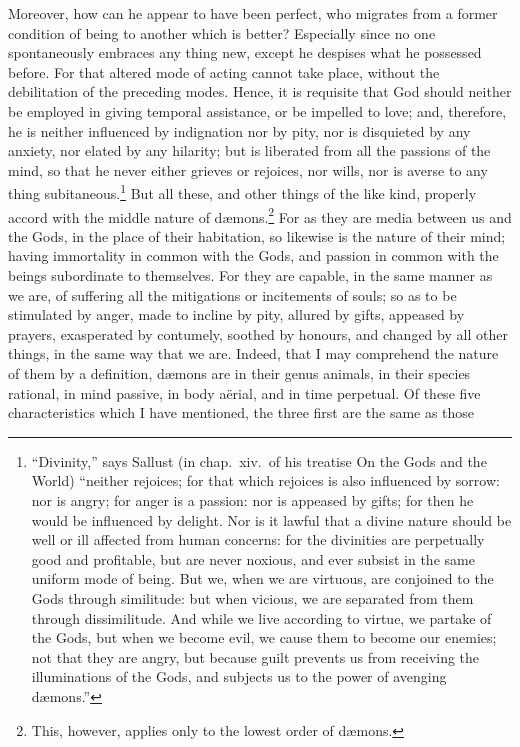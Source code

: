 \documentclass{article}
\begin{document}
Moreover, how can he appear to have been perfect, who migrates from a former
condition of being to another which is better? Especially since no one
spontaneously embraces any thing new, except he despises what he possessed
before. For that altered mode of acting cannot take place, without the
debilitation of the preceding modes. Hence, it is requisite that God should
neither be employed in giving temporal assistance, or be impelled to love; and,
therefore, he is neither influenced by indignation nor by pity, nor is
disquieted by any anxiety, nor elated by any hilarity; but is liberated from
all the passions of the mind, so that he never either grieves or rejoices, nor
wills, nor is averse to any thing subitaneous.\footnote{``Divinity,'' says
Sallust (in chap.~xiv.~of his treatise On the Gods and the World)
``neither rejoices; for that which rejoices is also influenced by sorrow: nor
is angry; for anger is a passion: nor is appeased by gifts; for then he would
be influenced by delight. Nor is it lawful that a divine nature should be well
or ill affected from human concerns: for the divinities are perpetually good
and profitable, but are never noxious, and ever subsist in the same uniform
mode of being. But we, when we are virtuous, are conjoined to the Gods through
similitude: but when vicious, we are separated from them through dissimilitude.
And while we live according to virtue, we partake of the Gods, but when we
become evil, we cause them to become our enemies; not that they are angry, but
because guilt prevents us from receiving the illuminations of the Gods, and
subjects us to the power of avenging d{\ae}mons.''} But all these, and other
things of the like kind, properly accord with the middle nature of
d{\ae}mons.\footnote{This, however, applies only to the lowest order of
d{\ae}mons.} For as they are media between us and the Gods, in the place of
their habitation, so likewise is the nature of their mind; having immortality
in common with the Gods, and passion in common with the beings subordinate to
themselves.  For they are capable, in the same manner as we are, of suffering
all the mitigations or incitements of souls; so as to be stimulated by anger,
made to incline by pity, allured by gifts, appeased by prayers, exasperated by
contumely, soothed by honours, and changed by all other things, in the same way
that we are. Indeed, that I may comprehend the nature of them by a definition,
d{\ae}mons are in their genus animals, in their species rational, in mind
passive, in body a\"{e}rial, and in time perpetual. Of these five
characteristics which I have mentioned, the three first are the same as those
\end{document}
